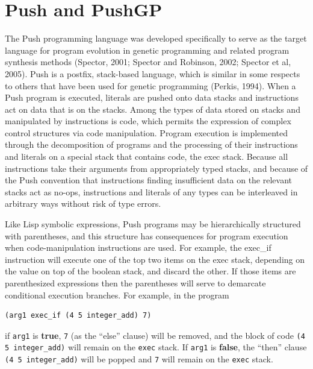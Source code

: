 \documentclass[graybox]{svmult}
\begin{document}
\section{Push and PushGP}

The Push programming language was developed specifically to serve as the target language for program evolution in genetic programming and related program synthesis methods
(Spector, 2001; Spector and Robinson, 2002; Spector et al, 2005). Push is a postfix, stack-based language, which is similar in some respects to others that have been used for genetic programming (Perkis, 1994). 
When a Push program is executed, literals are pushed
onto data stacks and instructions act on data that is on the stacks.
Among the types of data stored on stacks and manipulated by instructions is {\ttfamily code}, which permits the expression of complex control structures via code manipulation. Program execution is implemented through the decomposition of programs and the processing of their instructions and literals on a special stack that contains code, the {\ttfamily exec} stack.
Because all instructions take their arguments from appropriately typed stacks, and because of the Push convention that instructions finding insufficient data on the relevant stacks
act as {\ttfamily no-op}s, instructions and literals of any types can be interleaved in arbitrary ways without risk of type errors.

Like Lisp symbolic expressions, Push programs may be hierarchically
structured with parentheses, and this structure has consequences for program execution when code-manipulation instructions are used. For example, the {\ttfamily exec\_if} instruction will execute one of the top two items on the {\ttfamily exec} stack, depending on the value on top of the {\ttfamily boolean} stack, and discard the other. If those items are parenthesized expressions then the parentheses will serve to demarcate conditional execution branches. For example, in the program
\begin{verbatim}
(arg1 exec_if (4 5 integer_add) 7)
\end{verbatim}
if \texttt{arg1} is \textbf{true}, \texttt{7} (as the ``else'' clause) will be removed, and the block of code \texttt{(4 5 integer\_add)} will remain on the \texttt{exec} stack. If \texttt{arg1} is \textbf{false}, the ``then'' clause \texttt{(4 5 integer\_add)} will be popped and \texttt{7} will remain on the \texttt{exec} stack.
\end{document}

